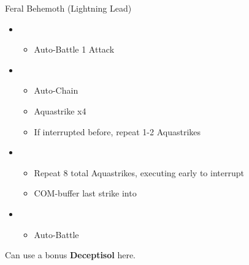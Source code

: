 	\begin{battle}[0:33]{Feral Behemoth (Lightning Lead)}
		\begin{itemize}
			\item \first
			      \begin{itemize}
				      \item Auto-Battle 1 Attack
			      \end{itemize}
			\item \fourth
			      \begin{itemize}
				      \item Auto-Chain
				      \item Aquastrike x4
				      \item If interrupted before, repeat 1-2 Aquastrikes
			      \end{itemize}
			\item \fifth
			      \begin{itemize}
				      \item Repeat 8 total Aquastrikes, executing early to interrupt
				      \item COM-buffer last strike into
			      \end{itemize}
			\item \sixth
			      \begin{itemize}
				      \item Auto-Battle
			      \end{itemize}
		\end{itemize}
	\end{battle}

	  Can use a bonus \textbf{Deceptisol} here.
	\vfill
\ 

